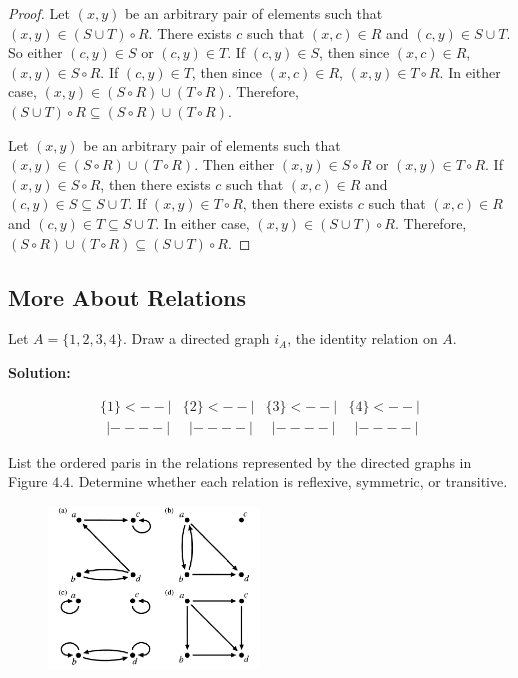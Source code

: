 \begin{proof}
    Let $(x, y)$ be an arbitrary pair of elements such that $(x, y) \in (S \cup T) \circ R$.
    There exists $c$ such that $(x, c) \in R$ and $(c, y) \in S \cup T$.
    So either $(c, y) \in S$ or $(c, y) \in T$.
    If $(c, y) \in S$, then since $(x, c) \in R$, $(x, y) \in S \circ R$.
    If $(c, y) \in T$, then since $(x, c) \in R$, $(x, y) \in T \circ R$.
    In either case, $(x, y) \in (S \circ R) \cup (T \circ R)$.
    Therefore, $(S \cup T) \circ R \subseteq (S \circ R) \cup (T \circ R)$.

    Let $(x, y)$ be an arbitrary pair of elements such that $(x, y) \in (S \circ R) \cup (T \circ R)$.
    Then either $(x, y) \in S \circ R$ or $(x, y) \in T \circ R$.
    If $(x, y) \in S \circ R$, then there exists $c$ such that $(x, c) \in R$ and $(c, y) \in S \subseteq S \cup T$.
    If $(x, y) \in T \circ R$, then there exists $c$ such that $(x, c) \in R$ and $(c, y) \in T \subseteq S \cup T$.
    In either case, $(x, y) \in (S \cup T) \circ R$.
    Therefore, $(S \circ R) \cup (T \circ R) \subseteq (S \cup T) \circ R$.
\end{proof}

\subsection{More About Relations}

\begin{tcolorbox}[title=Problem 3, breakable]
    Let $A = \{1, 2, 3, 4\}$. Draw a directed graph $i_A$, the identity relation on $A$.
\end{tcolorbox}

\textbf{Solution:}

\[
\begin{array}{cccc}
\{1\}<--| & \{2\}<--| & \{3\}<--| & \{4\}<--| \\
\ \ |----| & \ \ |----| & \ \ |----| & \ \ |----|
\end{array}
\]

\begin{tcolorbox}[title=Problem 4, breakable]
    List the ordered paris in the relations represented by the directed graphs in Figure $4.4$.
    Determine whether each relation is reflexive, symmetric, or transitive.
\end{tcolorbox}

\begin{figure}[h] 
\centering
\includegraphics[width=0.5\textwidth]{images/4.3_4.png} 
\end{figure}

